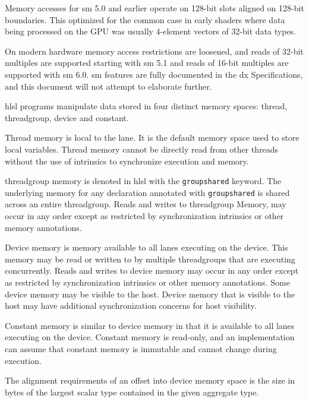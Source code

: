 
\p Memory accesses for \gls{sm} 5.0 and earlier operate on 128-bit slots aligned
on 128-bit boundaries. This optimized for the common case in early shaders where
data being processed on the GPU was usually 4-element vectors of 32-bit data
types.

\p On modern hardware memory access restrictions are loosened, and reads of
32-bit multiples are supported starting with \gls{sm} 5.1 and reads of 16-bit
multiples are supported with \gls{sm} 6.0. \gls{sm} features are fully
documented in the \gls{dx} Specifications, and this document will not attempt to
elaborate further.


\p \acrshort{hlsl} programs manipulate data stored in four distinct memory
spaces: thread, threadgroup, device and constant.


\p Thread memory is local to the \gls{lane}. It is the default memory space used to
store local variables. Thread memory cannot be directly read from other threads
without the use of intrinsics to synchronize execution and memory.


\p \gls{threadgroup} memory is denoted in \acrshort{hlsl} with the
\texttt{groupshared} keyword. The underlying memory for any declaration
annotated with \texttt{groupshared} is shared across an entire
\gls{threadgroup}. Reads and writes to \gls{threadgroup} Memory, may occur in
any order except as restricted by synchronization intrinsics or other memory
annotations.


\p Device memory is memory available to all \gls{lane}s executing on the device.
This memory may be read or written to by multiple \gls{threadgroup}s that are
executing concurrently. Reads and writes to device memory may occur in any order
except as restricted by synchronization intrinsics or other memory annotations.
Some device memory may be visible to the host. Device memory that is visible to
the host may have additional synchronization concerns for host visibility.


\p Constant memory is similar to device memory in that it is available to all
\gls{lane}s executing on the device. Constant memory is read-only, and an
implementation can assume that constant memory is immutable and cannot change
during execution.



\p The alignment requirements of an offset into device memory space is the size
 in bytes of the largest scalar type contained in the given aggregate type.

